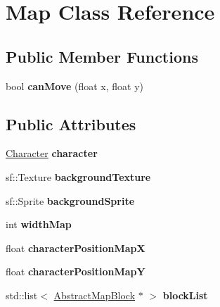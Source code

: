 \hypertarget{class_map}{}\section{Map Class Reference}
\label{class_map}
\subsection*{Public Member Functions}
\begin{DoxyCompactItemize}
\item 
\mbox{\label{class_map_a9e0db2b7f0c2cc2083da543050f0fa91}} 
bool {\bfseries can\+Move} (float x, float y)
\end{DoxyCompactItemize}
\subsection*{Public Attributes}
\begin{DoxyCompactItemize}
\item 
\mbox{\label{class_map_a00d7fac6e87f2ac95d0182bbb22fdac4}} 
\hyperlink{class_character}{Character} {\bfseries character}
\item 
\mbox{\label{class_map_a18202f9ebc5ddab14652bdacc81e3c72}} 
sf\+::\+Texture {\bfseries background\+Texture}
\item 
\mbox{\label{class_map_aa92b0ecd899641e3385613efcd037f65}} 
sf\+::\+Sprite {\bfseries background\+Sprite}
\item 
\mbox{\label{class_map_ac62ec077cb012a9fe7d987b466a48947}} 
int {\bfseries width\+Map}
\item 
\mbox{\label{class_map_acfd2fda55638ba32a092fac314f9f1c5}} 
float {\bfseries character\+Position\+MapX}
\item 
\mbox{\label{class_map_aa4e4d68c7babc74782b973a3b97431ea}} 
float {\bfseries character\+Position\+MapY}
\item 
\mbox{\label{class_map_ad185fe5369037999533e218f3f7ade8a}} 
std\+::list$<$ \hyperlink{class_abstract_map_block}{Abstract\+Map\+Block} $\ast$ $>$ {\bfseries block\+List}
\end{DoxyCompactItemize}

